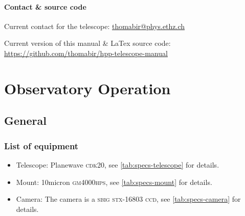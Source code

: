 \documentclass[a4paper, 11pt, fleqn]{memoir}
\begin{document}
\subsection*{Contact \& source code}

Current contact for the telescope: \url{thomabir@phys.ethz.ch}

\noindent Current version of this manual \& LaTex source code: \url{https://github.com/thomabir/hpp-telescope-manual}

\cleardoublepage

\tableofcontents

\mainmatter

\part{Observatory Operation}

\chapter{General}

\section{List of equipment}

\begin{itemize}
    \item Telescope: Planewave \textsc{cdk20}, see \cref{tab:specs-telescope} for details.
    \item Mount: 10micron \textsc{gm4000hps}, see \cref{tab:specs-mount} for details.
    \item Camera: The camera is a \textsc{sbig stx-16803} \textsc{ccd}, see \cref{tab:specs-camera} for details.
\end{itemize}
\end{document}

